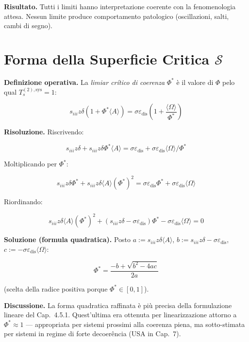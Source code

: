 \Proved{} \textbf{Risultato.} Tutti i limiti hanno interpretazione
coerente con la fenomenologia attesa. Nessun limite produce
comportamento patologico (oscillazioni, salti, cambi di segno).



\section{\texorpdfstring{Forma della Superficie Critica
\(\mathcal{S}\)}{Forma della Superficie Critica \textbackslash mathcal\{S\}}}\label{forma-della-superficie-critica-mathcals}

\Hypoth{} \textbf{Definizione operativa.} La \emph{limiar crítico di
coerenza} \(\Phi^*\) è il valore di \(\Phi\) pelo qual
\(T_s^{(2),\text{sys}} = 1\):

\[
s_{iii} z \delta (1 + \Phi^* \langle A\rangle) = \sigma \varepsilon_{\text{dis}} \left(1 + \frac{\langle\Omega\rangle}{\Phi^*}\right)
\]

\Proved{} \textbf{Risoluzione.} Riscrivendo:

\[
s_{iii} z \delta + s_{iii} z \delta \Phi^* \langle A\rangle = \sigma \varepsilon_{\text{dis}} + \sigma \varepsilon_{\text{dis}} \langle\Omega\rangle / \Phi^*
\]

Moltiplicando per \(\Phi^*\):

\[
s_{iii} z \delta \Phi^* + s_{iii} z \delta \langle A\rangle (\Phi^*)^2 = \sigma\varepsilon_{\text{dis}}\Phi^* + \sigma\varepsilon_{\text{dis}}\langle\Omega\rangle
\]

Riordinando:

\[
s_{iii} z \delta \langle A\rangle (\Phi^*)^2 + (s_{iii}z\delta - \sigma\varepsilon_{\text{dis}}) \Phi^* - \sigma\varepsilon_{\text{dis}}\langle\Omega\rangle = 0
\]

\Proved{} \textbf{Soluzione (formula quadratica).} Posto
\(a := s_{iii}z\delta\langle A\rangle\),
\(b := s_{iii}z\delta - \sigma\varepsilon_{\text{dis}}\),
\(c := -\sigma\varepsilon_{\text{dis}}\langle\Omega\rangle\):

\[
\boxed{\Phi^* = \frac{-b + \sqrt{b^2 - 4ac}}{2a}}
\]

(scelta della radice positiva porque \(\Phi^* \in [0,1]\)).

\Hypoth{} \textbf{Discussione.} La forma quadratica raffinata è più
precisa della formulazione lineare del Cap.~4.5.1. Quest'ultima era
ottenuta per linearizzazione attorno a \(\Phi^* \approx 1\) ---
appropriata per sistemi prossimi alla coerenza piena, ma sotto-stimata
per sistemi in regime di forte decoerência (USA in Cap.~7).

